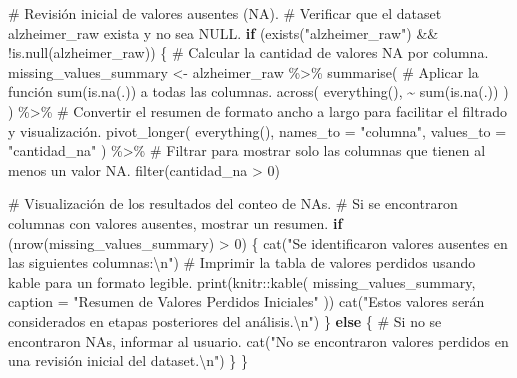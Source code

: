 \documentclass[
  letterpaper,
  DIV=11,
  numbers=noendperiod]{scrartcl}
\newenvironment{Shaded}{\begin{snugshade}}{\end{snugshade}}
\newcommand{\AttributeTok}[1]{\textcolor[rgb]{0.40,0.45,0.13}{#1}}
\newcommand{\CommentTok}[1]{\textcolor[rgb]{0.37,0.37,0.37}{#1}}
\newcommand{\ControlFlowTok}[1]{\textcolor[rgb]{0.00,0.23,0.31}{\textbf{#1}}}
\newcommand{\DecValTok}[1]{\textcolor[rgb]{0.68,0.00,0.00}{#1}}
\newcommand{\FunctionTok}[1]{\textcolor[rgb]{0.28,0.35,0.67}{#1}}
\newcommand{\NormalTok}[1]{\textcolor[rgb]{0.00,0.23,0.31}{#1}}
\newcommand{\OtherTok}[1]{\textcolor[rgb]{0.00,0.23,0.31}{#1}}
\newcommand{\SpecialCharTok}[1]{\textcolor[rgb]{0.37,0.37,0.37}{#1}}
\newcommand{\StringTok}[1]{\textcolor[rgb]{0.13,0.47,0.30}{#1}}
\begin{document}
\begin{Shaded}
\begin{Highlighting}[]
\CommentTok{\# Revisión inicial de valores ausentes (NA).}
\CommentTok{\# Verificar que el dataset \textquotesingle{}alzheimer\_raw\textquotesingle{} exista y no sea NULL.}
\ControlFlowTok{if}\NormalTok{ (}\FunctionTok{exists}\NormalTok{(}\StringTok{"alzheimer\_raw"}\NormalTok{) }\SpecialCharTok{\&\&} \SpecialCharTok{!}\FunctionTok{is.null}\NormalTok{(alzheimer\_raw)) \{}
  \CommentTok{\# Calcular la cantidad de valores NA por columna.}
\NormalTok{  missing\_values\_summary }\OtherTok{\textless{}{-}}\NormalTok{ alzheimer\_raw }\SpecialCharTok{\%\textgreater{}\%}
    \FunctionTok{summarise}\NormalTok{(}
      \CommentTok{\# Aplicar la función sum(is.na(.)) a todas las columnas.}
      \FunctionTok{across}\NormalTok{(}
        \FunctionTok{everything}\NormalTok{(),       }
        \SpecialCharTok{\textasciitilde{}} \FunctionTok{sum}\NormalTok{(}\FunctionTok{is.na}\NormalTok{(.))     }
\NormalTok{      )}
\NormalTok{    ) }\SpecialCharTok{\%\textgreater{}\%}
    \CommentTok{\# Convertir el resumen de formato ancho a largo para facilitar el filtrado y visualización.}
    \FunctionTok{pivot\_longer}\NormalTok{(}
      \FunctionTok{everything}\NormalTok{(),             }
      \AttributeTok{names\_to =} \StringTok{"columna"}\NormalTok{,     }
      \AttributeTok{values\_to =} \StringTok{"cantidad\_na"} 
\NormalTok{    ) }\SpecialCharTok{\%\textgreater{}\%}
    \CommentTok{\# Filtrar para mostrar solo las columnas que tienen al menos un valor NA.}
    \FunctionTok{filter}\NormalTok{(cantidad\_na }\SpecialCharTok{\textgreater{}} \DecValTok{0}\NormalTok{)   }

  \CommentTok{\# Visualización de los resultados del conteo de NAs.}
  \CommentTok{\# Si se encontraron columnas con valores ausentes, mostrar un resumen.}
  \ControlFlowTok{if}\NormalTok{ (}\FunctionTok{nrow}\NormalTok{(missing\_values\_summary) }\SpecialCharTok{\textgreater{}} \DecValTok{0}\NormalTok{) \{}
    \FunctionTok{cat}\NormalTok{(}\StringTok{"Se identificaron valores ausentes en las siguientes columnas:}\SpecialCharTok{\textbackslash{}n}\StringTok{"}\NormalTok{)}
    \CommentTok{\# Imprimir la tabla de valores perdidos usando kable para un formato legible.}
    \FunctionTok{print}\NormalTok{(knitr}\SpecialCharTok{::}\FunctionTok{kable}\NormalTok{(}
\NormalTok{      missing\_values\_summary,}
      \AttributeTok{caption =} \StringTok{"Resumen de Valores Perdidos Iniciales"}
\NormalTok{    ))}
    \FunctionTok{cat}\NormalTok{(}\StringTok{"Estos valores serán considerados en etapas posteriores del análisis.}\SpecialCharTok{\textbackslash{}n}\StringTok{"}\NormalTok{)}
\NormalTok{  \} }\ControlFlowTok{else}\NormalTok{ \{}
    \CommentTok{\# Si no se encontraron NAs, informar al usuario.}
    \FunctionTok{cat}\NormalTok{(}\StringTok{"No se encontraron valores perdidos en una revisión inicial del dataset.}\SpecialCharTok{\textbackslash{}n}\StringTok{"}\NormalTok{)}
\NormalTok{  \}}
\NormalTok{\}}
\end{Highlighting}
\end{Shaded}
\end{document}
